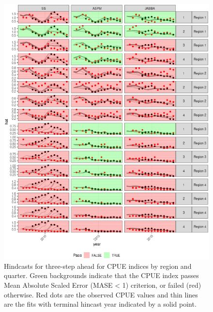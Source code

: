 \documentclass[11pt,a4paper]{article}
\begin{document}
{\begin{figure}[htbp]
\centering
\includegraphics[width=6in]{fig5.eps}
\caption{Hindcasts for three-step ahead for CPUE indices by region and quarter. Green backgrounds indicate that the CPUE index passes Mean Absolute Scaled Error (MASE < 1) criterion, or failed (red) otherwise. Red dots are the observed CPUE values and thin lines are the fits with terminal hincast year indicated by a solid point.}
\label{fig:hy3}
\end{figure}

}
\end{document}
